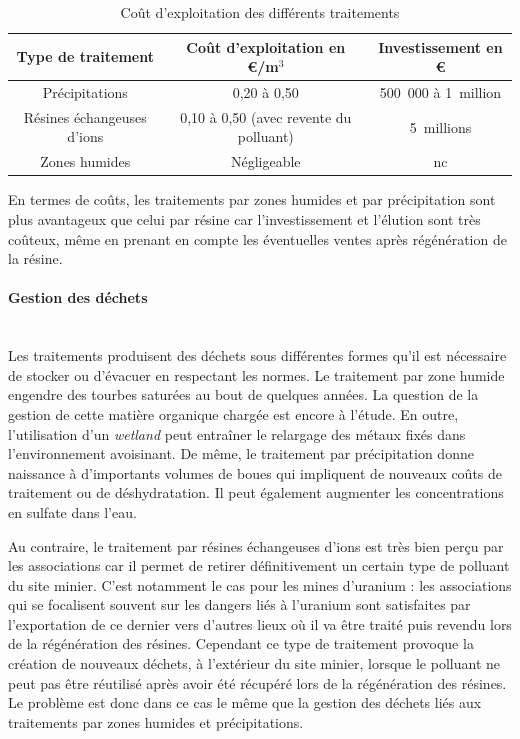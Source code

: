 \documentclass{article}
\begin{document}
\begin{table}[H]
   \centering
   \caption{Coût d'exploitation des différents traitements \cite{schick_les_2020}}
   \begin{tabular}{ |c |c |c |}
        \hline
        \textbf{Type de traitement} & \textbf{Coût d’exploitation en \euro{}/m$^3$} & \textbf{Investissement en \euro{}} \\ 
        \hline
        Précipitations & 0,20 à 0,50 & 500~000 à 1~million \\ 
        \hline
        Résines échangeuses d’ions & 0,10 à 0,50 (avec revente du polluant) & 5~millions \\
        \hline
        Zones humides & Négligeable & nc \\
        \hline
    \end{tabular}
\label{tab:cout_exploitation_traitements}
\end{table}

En termes de coûts, les traitements par zones humides et par précipitation sont plus avantageux que celui par résine car l’investissement et l’élution sont très coûteux, même en prenant en compte les éventuelles ventes après régénération de la résine. %

\paragraph{Gestion des déchets \\ \\}

Les traitements produisent des déchets sous différentes formes qu’il est nécessaire de stocker ou d’évacuer en respectant les normes. Le traitement par zone humide engendre des tourbes saturées au bout de quelques années. La question de la gestion de cette matière organique chargée est encore à l’étude. En outre, l’utilisation d’un \textit{wetland} peut entraîner le relargage des métaux fixés dans l’environnement avoisinant. De même, le traitement par précipitation donne naissance à d’importants volumes de boues qui impliquent de nouveaux coûts de traitement ou de déshydratation. Il peut également augmenter les concentrations en sulfate dans l’eau. 

Au contraire, le traitement par résines échangeuses d’ions est très bien perçu par les associations car il permet de retirer définitivement un certain type de polluant du site minier. C’est notamment le cas pour les mines d’uranium : les associations qui se focalisent souvent sur les dangers liés à l’uranium sont satisfaites par l’exportation de ce dernier vers d’autres lieux où il va être traité puis revendu lors de la régénération des résines. Cependant ce type de traitement provoque la création de nouveaux déchets, à l’extérieur du site minier, lorsque le polluant ne peut pas être réutilisé après avoir été récupéré lors de la régénération des résines. Le problème est donc dans ce cas le même que la gestion des déchets liés aux traitements par zones humides et précipitations.
\end{document}
